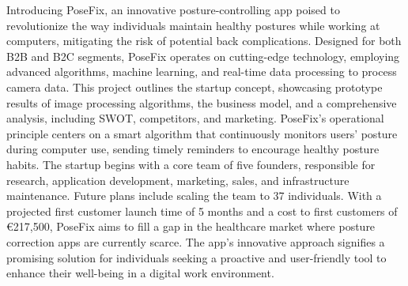 Introducing PoseFix, an innovative posture-controlling app poised to revolutionize the way individuals maintain healthy postures while working at computers, mitigating the risk of potential back complications. Designed for both B2B and B2C segments, PoseFix operates on cutting-edge technology, employing advanced algorithms, machine learning, and real-time data processing to process camera data.
This project outlines the startup concept, showcasing prototype results of image processing algorithms, the business model, and a comprehensive analysis, including SWOT, competitors, and marketing. PoseFix's operational principle centers on a smart algorithm that continuously monitors users' posture during computer use, sending timely reminders to encourage healthy posture habits.
The startup begins with a core team of five founders, responsible for research, application development, marketing, sales, and infrastructure maintenance. Future plans include scaling the team to 37 individuals. With a projected first customer launch time of 5 months and a cost to first customers of €217,500, PoseFix aims to fill a gap in the healthcare market where posture correction apps are currently scarce. The app's innovative approach signifies a promising solution for individuals seeking a proactive and user-friendly tool to enhance their well-being in a digital work environment.
